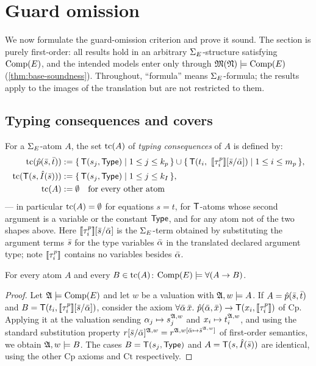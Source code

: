 \section{Guard omission}
\label{sec:guards}

We now formulate the guard-omission criterion and prove it sound.  The
section is purely first-order: all results hold in an arbitrary
$\Sig$-structure satisfying $\Comp$, and the intended models enter only
through $\MN \models \Comp$ (\cref{thm:base-soundness}).  Throughout,
``formula'' means $\Sig$-formula; the results apply to the images of the
translation but are not restricted to them.

\subsection{Typing consequences and covers}

\begin{definition}
  \label{def:tc}
  For a $\Sig$-atom $A$, the set $\tc{A}$ of \emph{typing consequences} of
  $A$ is defined by:
  \begin{align*}
    \tc{\hat p(\tup s, \tup t)} &\defeq
      \{\, \T(s_j, \TypeC) \mid 1 \le j \le k_p \,\} \cup
      \{\, \T(t_i,\ \enc{\tau^p_i}[\tup s/\tup\alpha]) \mid
           1 \le i \le m_p \,\}, \\
    \tc{\T(s, \hat I(\tup s))} &\defeq
      \{\, \T(s_j, \TypeC) \mid 1 \le j \le k_I \,\}, \\
    \tc{A} &\defeq \emptyset \quad \text{for every other atom}
  \end{align*}
  --- in particular $\tc{A} = \emptyset$ for equations $s = t$, for
  $\T$-atoms whose second argument is a variable or the constant $\TypeC$,
  and for any atom not of the two shapes above.  Here
  $\enc{\tau^p_i}[\tup s/\tup\alpha]$ is the $\Sig$-term obtained by
  substituting the argument terms $\tup s$ for the type variables
  $\tup\alpha$ in the translated declared argument type; note
  $\enc{\tau^p_i}$ contains no variables besides $\tup\alpha$.
\end{definition}

\begin{lemma}[Strictness]
  \label{lem:strictness}
  For every atom $A$ and every $B \in \tc{A}$:
  $\Comp \models \forall(A \imp B)$.
\end{lemma}

\begin{proof}
  Let $\AA \models \Comp$ and let $w$ be a valuation with
  $\AA, w \models A$.  If $A = \hat p(\tup s, \tup t)$ and
  $B = \T(t_i, \enc{\tau^p_i}[\tup s/\tup\alpha])$, consider the axiom
  $\forall\tup\alpha\,\tup x.\ \hat p(\tup\alpha,\tup x) \imp
  \T(x_i, \enc{\tau^p_i})$ of $\mathrm{Cp}$.  Applying it at the valuation
  sending $\alpha_j \mapsto \den{s_j}{\AA,w}$ and
  $x_i \mapsto \den{t_i}{\AA,w}$, and using the standard substitution
  property $\den{r[\tup s/\tup\alpha]}{\AA,w} =
  \den{r}{\AA, w[\tup\alpha \mapsto \den{\tup s}{\AA,w}]}$ of first-order
  semantics, we obtain $\AA, w \models B$.  The cases
  $B = \T(s_j,\TypeC)$ and $A = \T(s, \hat I(\tup s))$ are identical,
  using the other $\mathrm{Cp}$ axioms and $\mathrm{Ct}$ respectively.
\end{proof}

